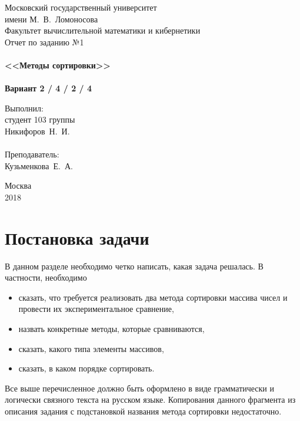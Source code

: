 \documentclass[a4paper,12pt,titlepage,final]{article}
\begin{document}
\begin{titlepage}
    \begin{center}
	{\small \sc Московский государственный университет \\имени М.~В.~Ломоносова\\
	Факультет вычислительной математики и кибернетики\\}
	\vfill
	{\Large \sc Отчет по заданию №1}\\
	~\\
	{\large \bf <<Методы сортировки>>}\\ 
	~\\
	{\large \bf Вариант 2 / 4 / 2 / 4}
    \end{center}
    \begin{flushright}
	\vfill {Выполнил:\\
	студент 103 группы\\
	Никифоров~Н.~И.\\
	~\\
	Преподаватель:\\
	Кузьменкова~Е.~А.}
    \end{flushright}
    \begin{center}
	\vfill
	{\small Москва\\2018}
    \end{center}
\end{titlepage}

\tableofcontents
\newpage

\section{Постановка задачи}

В данном разделе необходимо четко написать, какая задача решалась. В частности, необходимо
\begin{itemize}
\item сказать, что требуется реализовать два метода сортировки массива чисел и провести их
    экспериментальное сравнение,
\item назвать конкретные методы, которые сравниваются,
\item сказать, какого типа элементы массивов,
\item сказать, в каком порядке сортировать.
\end{itemize}
Все выше перечисленное должно быть оформлено в виде грамматически и логически
связного текста на русском языке. Копирования данного фрагмента из описания задания 
с подстановкой названия метода сортировки недостаточно.
\end{document}
